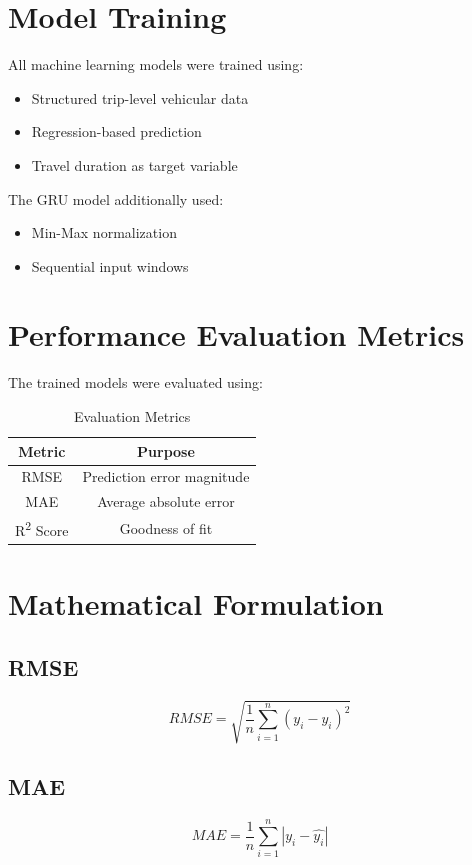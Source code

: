 \documentclass[12pt,a4paper]{report}
\begin{document}
\section{Model Training}
All machine learning models were trained using:
\begin{itemize}
    \item Structured trip-level vehicular data
    \item Regression-based prediction
    \item Travel duration as target variable
\end{itemize}
The GRU model additionally used:
\begin{itemize}
    \item Min-Max normalization
    \item Sequential input windows
\end{itemize}

\section{Performance Evaluation Metrics}
The trained models were evaluated using:
\begin{table}[H]
\centering
\begin{tabular}{|c|c|}
\hline
\textbf{Metric} & \textbf{Purpose} \\
\hline
RMSE & Prediction error magnitude \\
MAE & Average absolute error \\
R\textsuperscript{2} Score & Goodness of fit \\
\hline
\end{tabular}
\caption{Evaluation Metrics}
\end{table}

\section{Mathematical Formulation}
\subsection{RMSE}
\begin{equation}
RMSE = \sqrt{\frac{1}{n}\sum_{i=1}^{n}(y_i - \hat{y_i})^2}
\end{equation}
\subsection{MAE}
\begin{equation}
MAE = \frac{1}{n}\sum_{i=1}^{n}|y_i - \hat{y_i}|
\end{equation}
\end{document}
